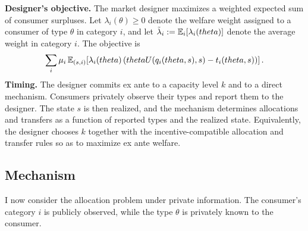 \documentclass{class}
\begin{document}
\noindent\textbf{Designer's objective.}
The market designer maximizes a weighted expected sum of consumer surpluses. Let $\lambda_i(\theta) \ge 0$ denote the welfare weight assigned to a consumer of type $\theta$ in category $i$, and let $\tilde\lambda_i := \mathbb{E}_{i}[\lambda_i(theta)]$ denote the average weight in category $i$. The objective is
\[
\sum_i \mu_i \,
\mathbb{E}_{(s,i)}\!\left[
\lambda_i(theta)\left(theta U(q_i(theta,s),s) - t_i(theta,s)\right)
\right].
\]
\noindent\textbf{Timing.} The designer commits ex ante to a capacity level \(k\) and to a direct mechanism. Consumers privately observe their types and report them to the designer. The state \(s\) is then realized, and the mechanism determines allocations and transfers as a function of reported types and the realized state. Equivalently, the designer chooses \(k\) together with the incentive-compatible allocation and transfer rules so as to maximize ex ante welfare.

\subsection{Mechanism}\label{sec:PI}

I now consider the allocation problem under private information. The consumer’s category $i$ is publicly observed, while the type $\theta$ is privately known to the consumer. 
\end{document}
